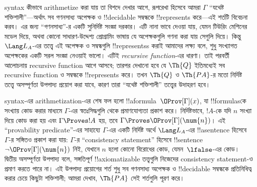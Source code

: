 \documentclass[../../../include/open-logic-section]{subfiles}
\begin{document}
syntax কীভাবে arithmetize করা যায় তা বিশদে দেখার আগে, রূপরেখা হিসেবে আমরা
$\Gamma$ ``যথেষ্ট শক্তিশালী''—অর্থাৎ সব গণনসাধ্য অপেক্ষক ও !!{decidable}
সম্বন্ধকে !!{represents} করে—এই শর্তটি বিবেচনা করব। এর জন্য ``গণনসাধ্য''-র
একটি সুনির্দিষ্ট সংজ্ঞা দরকার। এটি নানা ভাবে দেওয়া যায়, যেমন টিউরিং
মেশিনের মডেল দিয়ে, অথবা কোনো সাধারণ-উদ্দেশ্য প্রোগ্রামিং ভাষায় যে অপেক্ষকগুলি
গণনা করা যায় সেগুলি দিয়ে। কিন্তু $\Lang L_A$-এর তত্ত্বে এই অপেক্ষক ও
সম্বন্ধগুলি !!{represents}s করাই আমাদের লক্ষ্য বলে, শুধু সংখ্যাগত অপেক্ষকের
একটি সরল সংজ্ঞা নেওয়াই ভালো। এটিই \emph{recursive function}-এর ধারণা। তাই
পরবর্তী আলোচনায় recursive function আগে আসবে; তারপর দেখানো হবে যে
$\Th{Q}$ ইতিমধ্যেই সব recursive function ও সম্বন্ধকে !!{represents} করে।
তখন $\Th{Q}$ ও $\Th{PA}$-র মতো নির্দিষ্ট তত্ত্বে অসম্পূর্ণতা উপপাদ্য প্রয়োগ
করা যাবে, কারণ তারা ``যথেষ্ট শক্তিশালী'' তত্ত্বের উদাহরণ হবে।

syntax-এর arithmetization-এর শেষ ফল হলো !!a{formula}~$\OProv[\Gamma](x)$,
যা !!{formula}sকে সংখ্যায় কোড করার মাধ্যমে $\Gamma$-এর স্বতঃসিদ্ধগুলি
থেকে প্রমাণযোগ্যতা প্রকাশ করে। নির্দিষ্টভাবে, $!A$-কে যদি $n$ সংখ্যা দিয়ে
কোড করা হয় এবং $\Gamma \Proves !A$ হয়, তবে
$\Gamma \Proves \OProv[\Gamma](\num{n})$। এই ``provability predicate''-এর
সাহায্যে $\Gamma$-এর একটি নির্দিষ্ট অর্থে $\Lang L_A$-এর !!a{sentence} হিসেবে $\Gamma$-র
সঙ্গিতও প্রকাশ করা যায়: $\Gamma$-র ``consistency statement'' হিসেবে
!!{sentence} $\lnot \OProv[\Gamma](\num{n})$ নিই, যেখানে $n$ হলো কোনো
বিরোধের কোড, যেমন~$\lfalse$-এর কোড। দ্বিতীয় অসম্পূর্ণতা উপপাদ্য বলে,
সঙ্গতিপূর্ণ !!{axiomatizable} তত্ত্বগুলি নিজেদের consistency statement-ও
প্রমাণ করতে পারে না। এই উপপাদ্য প্রয়োগের শর্ত শুধু সব গণনসাধ্য অপেক্ষক ও
!!{decidable} সম্বন্ধকে প্রতিনিধিত্ব করার চেয়ে কিছুটা শক্তিশালী; আমরা দেখাব,
$\Th{PA}$ সেই শর্তগুলি পূরণ করে।
\end{document}
